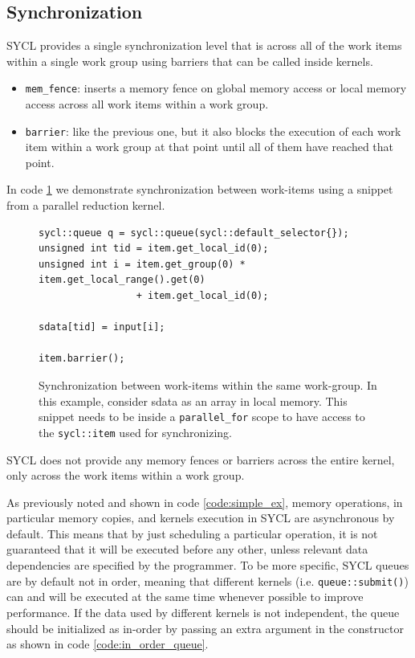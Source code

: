 \subsection{Synchronization}
\label{ch:synchronization}
SYCL provides a single synchronization level that is across all of the work items within a single work group using barriers that can be called inside kernels.
\begin{itemize}
    \item \Verb "mem_fence": inserts a memory fence on global memory access or local memory access across all work items within a work group.
    \item \Verb "barrier": like the previous one, but it also blocks the execution of each work item within a work group at that point until all of them have reached that point.
\end{itemize}
In code \ref{code:item_barriers} we demonstrate synchronization between work-items using a snippet from a parallel reduction kernel.

\begin{figure}[ht!]
\renewcommand{\figurename}{Code}
\begin{verbatim}
sycl::queue q = sycl::queue(sycl::default_selector{});
unsigned int tid = item.get_local_id(0);
unsigned int i = item.get_group(0) * item.get_local_range().get(0) 
                 + item.get_local_id(0);

sdata[tid] = input[i];

item.barrier();
\end{verbatim}
\caption{Synchronization between work-items within the same work-group. In this example, consider sdata as an array in local memory. This snippet needs to be inside a \protect\Verb "parallel_for" scope to have access to the \protect\Verb "sycl::item" used for synchronizing.}
\label{code:item_barriers}
\end{figure}

SYCL does not provide any memory fences or barriers across the entire kernel, only across the work items within a work group.

As previously noted and shown in code \ref{code:simple_ex}, memory operations, in particular memory copies, and kernels execution in SYCL are asynchronous by default. This means that by just scheduling a particular operation, it is not guaranteed that it will be executed before any other, unless relevant data dependencies are specified by the programmer. To be more specific, SYCL queues are by default not in order, meaning that different kernels (i.e. \Verb "queue::submit()") can and will be executed at the same time whenever possible to improve performance.
If the data used by different kernels is not independent, the queue should be initialized as in-order by passing an extra argument in the constructor as shown in code \ref{code:in_order_queue}.

